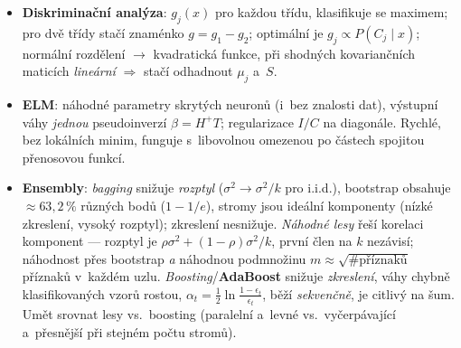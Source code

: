\documentclass[11pt,a4paper]{article}
\theoremstyle{definition}
\begin{document}
\begin{itemize}
      $p=\sigma(z)=1/(1+e^{-z})$; učení maximální věrohodností / minimalizací křížové
      entropie; $\sigma'=\sigma(1-\sigma)$ $\Rightarrow$ adaptační pravidlo
      $\Delta\beta_j=\eta\sum_i(y_i-\sigma(z_i))x_{ij}$.
\item \textbf{Diskriminační analýza}: $g_j(x)$ pro každou třídu, klasifikuje se maximem; pro
      dvě třídy stačí znaménko $g=g_1-g_2$; optimální je $g_j\propto P(C_j\mid x)$; normální
      rozdělení $\to$ kvadratická funkce, při shodných kovariančních maticích \emph{lineární}
      $\Rightarrow$ stačí odhadnout $\mu_j$ a~$S$.
\item \textbf{ELM}: náhodné parametry skrytých neuronů (i~bez znalosti dat), výstupní váhy
      \emph{jednou} pseudoinverzí $\beta=H^{+}T$; regularizace $I/C$ na diagonále. Rychlé,
      bez lokálních minim, funguje s~libovolnou omezenou po částech spojitou přenosovou funkcí.
\item \textbf{Ensembly}: \emph{bagging} snižuje \emph{rozptyl} ($\sigma^2\to\sigma^2/k$ pro
      i.i.d.), bootstrap obsahuje $\approx 63{,}2\,\%$ různých bodů ($1-1/e$), stromy jsou
      ideální komponenty (nízké zkreslení, vysoký rozptyl); zkreslení nesnižuje.
      \emph{Náhodné lesy} řeší korelaci komponent --- rozptyl je
      $\rho\sigma^2+(1-\rho)\sigma^2/k$, první člen na $k$ nezávisí; náhodnost přes bootstrap
      \emph{a} náhodnou podmnožinu $m\approx\sqrt{\#\text{příznaků}}$ příznaků v~každém uzlu.
      \emph{Boosting}/\textbf{AdaBoost} snižuje \emph{zkreslení}, váhy chybně klasifikovaných
      vzorů rostou, $\alpha_t=\frac12\ln\frac{1-\epsilon_t}{\epsilon_t}$, běží
      \emph{sekvenčně}, je citlivý na šum. Umět srovnat lesy vs.\ boosting (paralelní
      a~levné vs.\ vyčerpávající a~přesnější při stejném počtu stromů).
\end{itemize}
\end{document}
